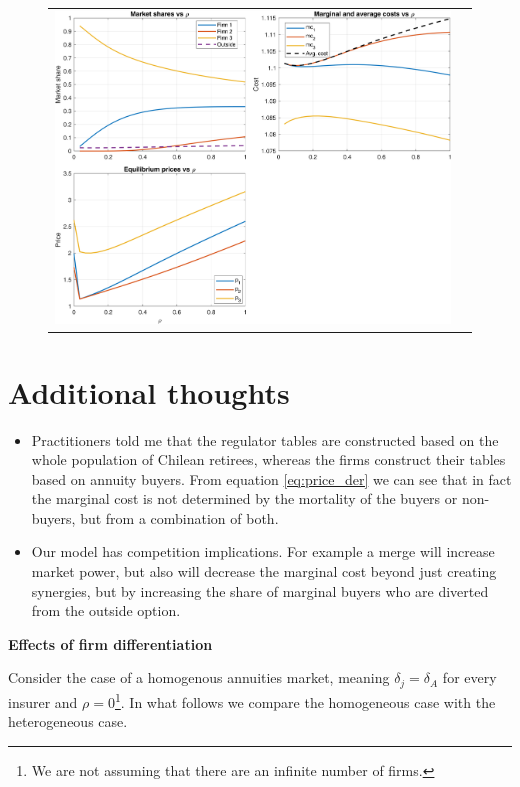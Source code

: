\documentclass[12pt]{article}
\theoremstyle{plain}
\theoremstyle{plain}
\begin{document}
 \begin{figure}[H]
\caption{}
 \label{fig:sigma}
\centering{}%
\begin{tabular}{cc}
\includegraphics[scale=.7]{figures/simulations/rho_panels.png} 
\end{tabular}
\end{figure}
 

\section{Additional thoughts}

\begin{itemize}
    \item Practitioners told me that the regulator tables are constructed based on the whole population of Chilean retirees, whereas the firms construct their tables based on annuity buyers. From equation \ref{eq:price_der} we can see that in fact the marginal cost is not determined by the mortality of the buyers or non-buyers, but from a combination of both. 

    \item Our model has competition implications. For example a merge will increase market power, but also will decrease the marginal cost beyond just creating synergies, but by increasing the share of marginal buyers who are diverted from the outside option. 
\end{itemize}


\textbf{Effects of firm differentiation}

Consider the case of a homogenous  annuities market, meaning $\delta_j = \delta_A$ for every insurer and $\rho = 0$\footnote{We are not assuming that there are an infinite number of firms.}.
In what follows we compare the homogeneous case with the heterogeneous case. 
\end{document}
